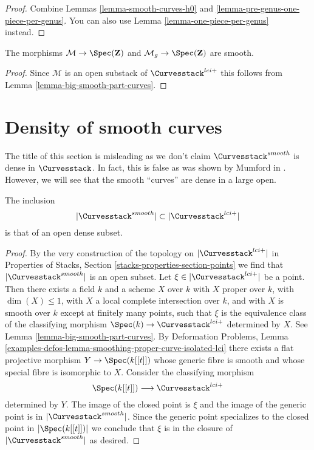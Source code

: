 \begin{proof}
Combine Lemmas \ref{lemma-smooth-curves-h0} and
\ref{lemma-pre-genus-one-piece-per-genus}.
You can also use
Lemma \ref{lemma-one-piece-per-genus}
instead.
\end{proof}

\begin{lemma}
\label{lemma-smooth-curves-h0-smooth}
The morphisms $\mathcal{M} \to \Spec(\mathbf{Z})$ and
$\mathcal{M}_g \to \Spec(\mathbf{Z})$
are smooth.
\end{lemma}

\begin{proof}
Since $\mathcal{M}$ is an open substack of
$\Curvesstack^{lci+}$ this follows from
Lemma \ref{lemma-big-smooth-part-curves}.
\end{proof}





\section{Density of smooth curves}
\label{section-smooth-is-dense}

\noindent
The title of this section is misleading as we don't claim
$\Curvesstack^{smooth}$ is dense in $\Curvesstack$.
In fact, this is false as was shown by Mumford in \cite{PathologiesIV}.
However, we will see that the smooth ``curves'' are dense
in a large open.

\begin{lemma}
\label{lemma-smooth-dense}
The inclusion
$$
|\Curvesstack^{smooth}| \subset |\Curvesstack^{lci+}|
$$
is that of an open dense subset.
\end{lemma}

\begin{proof}
By the very construction of the topology on
$|\Curvesstack^{lci+}|$ in
Properties of Stacks, Section \ref{stacks-properties-section-points}
we find that $|\Curvesstack^{smooth}|$
is an open subset. Let $\xi \in |\Curvesstack^{lci+}|$ be a point.
Then there exists a field $k$ and a scheme $X$ over $k$
with $X$ proper over $k$, with $\dim(X) \leq 1$,
with $X$ a local complete intersection over $k$, and
with $X$ is smooth over $k$ except at finitely many points, such
that $\xi$ is the equivalence class of the
classifying morphism $\Spec(k) \to \Curvesstack^{lci+}$ determined by $X$.
See Lemma \ref{lemma-big-smooth-part-curves}.
By Deformation Problems, Lemma
\ref{examples-defos-lemma-smoothing-proper-curve-isolated-lci}
there exists a flat projective morphism $Y \to \Spec(k[[t]])$
whose generic fibre is smooth and whose special fibre is
isomorphic to $X$. Consider the classifying morphism
$$
\Spec(k[[t]]) \longrightarrow \Curvesstack^{lci+}
$$
determined by $Y$. The image of the closed point is $\xi$
and the image of the generic point is in $|\Curvesstack^{smooth}|$.
Since the generic point specializes to the closed point in
$|\Spec(k[[t]])|$ we conclude that $\xi$ is in the closure
of $|\Curvesstack^{smooth}|$ as desired.
\end{proof}







